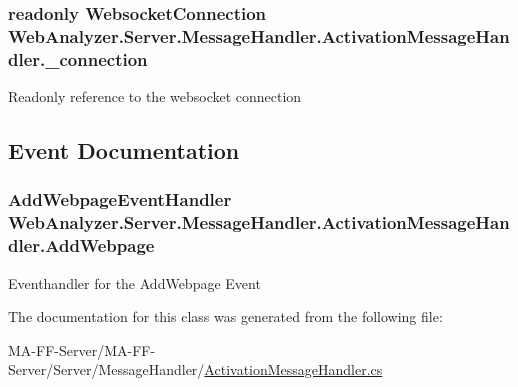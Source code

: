 \subsubsection[{\+\_\+connection}]{\setlength{\rightskip}{0pt plus 5cm}readonly {\bf Websocket\+Connection} Web\+Analyzer.\+Server.\+Message\+Handler.\+Activation\+Message\+Handler.\+\_\+connection\hspace{0.3cm}{\ttfamily [private]}}\label{class_web_analyzer_1_1_server_1_1_message_handler_1_1_activation_message_handler_a72e20f23d13fafc255e8e860bfe8f8fa}


Readonly reference to the websocket connection 



\subsection{Event Documentation}
\hypertarget{class_web_analyzer_1_1_server_1_1_message_handler_1_1_activation_message_handler_aeab84864e057b34b024a8b8a11f3e135}{}
\subsubsection[{Add\+Webpage}]{\setlength{\rightskip}{0pt plus 5cm}Add\+Webpage\+Event\+Handler Web\+Analyzer.\+Server.\+Message\+Handler.\+Activation\+Message\+Handler.\+Add\+Webpage}\label{class_web_analyzer_1_1_server_1_1_message_handler_1_1_activation_message_handler_aeab84864e057b34b024a8b8a11f3e135}


Eventhandler for the Add\+Webpage Event 



The documentation for this class was generated from the following file\+:\begin{DoxyCompactItemize}
\item 
M\+A-\/\+F\+F-\/\+Server/\+M\+A-\/\+F\+F-\/\+Server/\+Server/\+Message\+Handler/\hyperlink{_activation_message_handler_8cs}{Activation\+Message\+Handler.\+cs}\end{DoxyCompactItemize}
